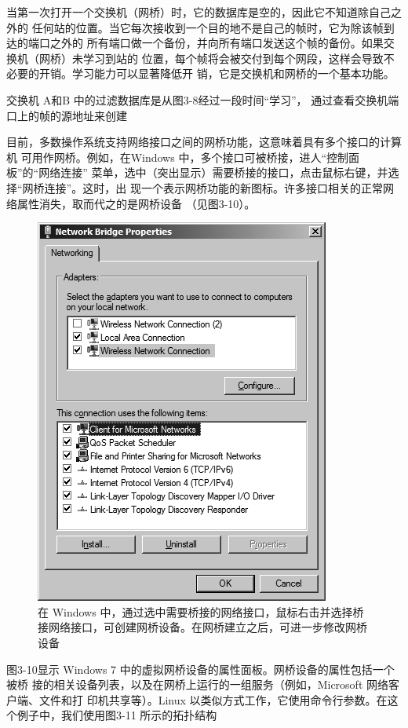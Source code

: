当第一次打开一个交换机（网桥）时，它的数据库是空的，因此它不知道除自己之外的
任何站的位置。当它每次接收到一个目的地不是自己的帧时，它为除该帧到达的端口之外的
所有端口做一个备份，并向所有端口发送这个帧的备份。如果交换机（网桥）未学习到站的
位置，每个帧将会被交付到每个网段，这样会导致不必要的开销。学习能力可以显著降低开
销，它是交换机和网桥的一个基本功能。

交换机 A和B 中的过滤数据库是从图3-8经过一段时间“学习”，
通过查看交换机端口上的帧的源地址来创建

目前，多数操作系统支持网络接口之间的网桥功能，这意味着具有多个接口的计算机
可用作网桥。例如，在Windows 中，多个接口可被桥接，进人“控制面板”的“网络连接”
菜单，选中（突出显示）需要桥接的接口，点击鼠标右键，并选择“网桥连接”。这时，出
现一个表示网桥功能的新图标。许多接口相关的正常网络属性消失，取而代之的是网桥设备
（见图3-10）。

\begin{figure}
  \centering
  \includegraphics[scale=0.5]{imgs/3/3-10.png}
  \caption{在 Windows 中，通过选中需要桥接的网络接口，鼠标右击并选择桥接网络接口，可创建网桥设备。在网桥建立之后，可进一步修改网桥设备}
\end{figure}

图3-10显示 Windows 7 中的虚拟网桥设备的属性面板。网桥设备的属性包括一个被桥
接的相关设备列表，以及在网桥上运行的一组服务（例如，Microsoft 网络客户端、文件和打
印机共享等）。Linux 以类似方式工作，它使用命令行参数。在这个例子中，我们使用图3-11
所示的拓扑结构

